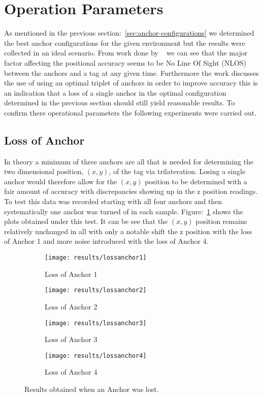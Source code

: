 \section{Operation Parameters}\label{sec:op-params}
As mentioned in the previous section:~\ref{sec:anchor-configurations} we determined the best anchor configurations for the given environment but the results were collected in an ideal scenario.
From work done by ~\citet{evaluwb} we can see that the major factor affecting the positional accuracy seems to be No Line Of Sight (NLOS) between the anchors and a tag at any given time.
Furthermore the work discusses the use of using an optimal triplet of anchors in order to improve accuracy this is an indication that a loss of a single anchor in the optimal configuration determined in the previous section should still yield reasonable results.
To confirm there operational parameters the following experiments were carried out.

\subsection{Loss of Anchor}\label{subsec:loss-of-anchor}
In theory a minimum of three anchors are all that is needed for determining the two dimensional position, $(x,y)$, of the tag via trilateration.
Losing a single anchor would therefore allow for the $(x,y)$ position to be determined with a fair amount of accuracy with discrepancies showing up in the z position readings.
To test this data was recorded starting with all four anchors and then systematically one anchor was turned of in each sample.
Figure:~\ref{fig:Loss_anchors} shows the plots obtained under this test.
It can be see that the $(x,y)$ position remains relatively unchanged in all with only a notable shift the z position with the loss of Anchor 1 and more noise introduced with the loss of Anchor 4.

\begin{figure}[h!]
    \centering
    \begin{subfigure}{0.45\textwidth}
            \texttt{[image: results/lossanchor1]}
            \caption{Loss of Anchor 1}
    \end{subfigure}
    \begin{subfigure}{0.45\textwidth}
            \texttt{[image: results/lossanchor2]}
            \caption{Loss of Anchor 2}
    \end{subfigure}

    \begin{subfigure}{0.45\textwidth}
            \texttt{[image: results/lossanchor3]}
            \caption{Loss of Anchor 3}
    \end{subfigure}
    \begin{subfigure}{0.45\textwidth}
            \texttt{[image: results/lossanchor4]}
            \caption{Loss of Anchor 4}
    \end{subfigure}
    \caption{Results obtained when an Anchor was lost.}
    \label{fig:Loss_anchors}
\end{figure}
\newpage
